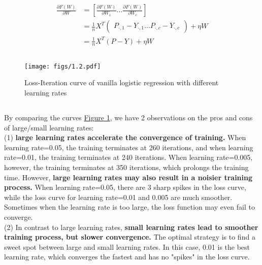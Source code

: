\documentclass{article}
\begin{document}
        \begin{align*}
            \frac{\partial F(W)}{\partial W}
            &=\left[\frac{\partial F(W)}{\partial W_{1}}\dots \frac{\partial F(W)}{\partial W_{c}}\right]\\
            &=\frac{1}{n}X^T\begin{pmatrix}
                P_{\cdot,1}-Y_{\cdot,1}\dots P_{\cdot,c}-Y_{\cdot,c}
            \end{pmatrix}+\eta W\\
            &=\frac{1}{n}X^T(P-Y)+\eta W
        \end{align*}

        \subsection{}
        \begin{figure}[hbt!]
            \centering
            \texttt{[image: figs/1.2.pdf]}
            \caption{Loss-Iteration curve of vanilla logistic regression with different learning rates}
            \label{fig:1.2}
        \end{figure}
        
        \subsection{}
        By comparing the curves \hyperref[fig:1.2]{Figure 1}, we have 2 observations on the pros and cons of large/small learning rates:\\
        (1) \textbf{large learning rates accelerate the convergence of training.} 
        When learning rate=0.05, the training terminates at 260 iterations, and when learning rate=0.01, the training terminates at 240 iterations.
        When learning rate=0.005, however, the training terminates at 350 iterations, which prolongs the training time.
        However, \textbf{large learning rates may also result in a noisier training process.} 
        When learning rate=0.05, there are 3 sharp spikes in the loss curve, while the loss curve for learning rate=0.01 and 0.005 are much smoother. 
        Sometimes when the learning rate is too large, the loss function may even fail to converge. \\
        (2) In contrast to large learning rates, \textbf{small learning rates lead to smoother training process, but slower convergence.}
        The optimal strategy is to find a sweet spot between large and small learning rates.
        In this case, 0.01 is the best learning rate, which converges the fastest and has no "spikes" in the loss curve.
\end{document}
